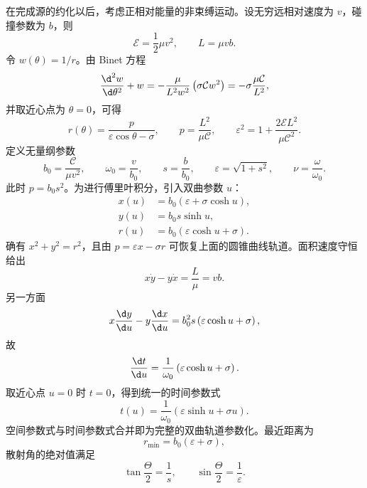 在完成源的约化以后，考虑正相对能量的非束缚运动。设无穷远相对速度为 $v$，碰撞参数为 $b$，则
\begin{equation*}
	\mathcal E=\frac{1}{2}\mu v^2,
	\qquad
	L=\mu vb.
\end{equation*}
令 $w(\theta)=1/r$。由 Binet 方程
\begin{equation*}
	\frac{\d^2w}{\d\theta^2}+w
	=-\frac{\mu}{L^2w^2}\left(\sigma\mathcal Cw^2\right)
	=-\sigma\frac{\mu\mathcal C}{L^2},
\end{equation*}
并取近心点为 $\theta=0$，可得
\begin{equation*}
	r(\theta)=\frac{p}{\varepsilon\cos\theta-\sigma},
	\qquad
	p=\frac{L^2}{\mu\mathcal C},
	\qquad
	\varepsilon^2=1+\frac{2\mathcal EL^2}{\mu\mathcal C^2}.
\end{equation*}
定义无量纲参数
\begin{equation*}
	b_0=\frac{\mathcal C}{\mu v^2},
	\qquad
	\omega_0=\frac{v}{b_0},
	\qquad
	s=\frac{b}{b_0},
	\qquad
	\varepsilon=\sqrt{1+s^2},
	\qquad
	\nu=\frac{\omega}{\omega_0}.
\end{equation*}
此时 $p=b_0s^2$。为进行傅里叶积分，引入双曲参数 $u$：
\begin{equation*}
	\begin{aligned}
	x(u)&=b_0\left(\varepsilon+\sigma\cosh u\right),\\
	y(u)&=b_0s\sinh u,\\
	r(u)&=b_0\left(\varepsilon\cosh u+\sigma\right).
	\end{aligned}
\end{equation*}
确有 $x^2+y^2=r^2$，且由 $p=\varepsilon x-\sigma r$ 可恢复上面的圆锥曲线轨道。面积速度守恒给出
\begin{equation*}
	x\dot y-y\dot x=\frac{L}{\mu}=vb.
\end{equation*}
另一方面
\begin{equation*}
	x\frac{\d y}{\d u}-y\frac{\d x}{\d u}
	=b_0^2s\left(\varepsilon\cosh u+\sigma\right),
\end{equation*}
故
\begin{equation*}
	\frac{\d t}{\d u}
	=\frac{1}{\omega_0}\left(\varepsilon\cosh u+\sigma\right).
\end{equation*}
取近心点 $u=0$ 时 $t=0$，得到统一的时间参数式
\begin{equation*}
	t(u)=\frac{1}{\omega_0}\left(\varepsilon\sinh u+\sigma u\right).
\end{equation*}
空间参数式与时间参数式合并即为完整的双曲轨道参数化。最近距离为
\begin{equation*}
	r_{\min}=b_0(\varepsilon+\sigma),
\end{equation*}
散射角的绝对值满足
\begin{equation*}
	\tan\frac{\Theta}{2}=\frac{1}{s},
	\qquad
	\sin\frac{\Theta}{2}=\frac{1}{\varepsilon}.
\end{equation*}

